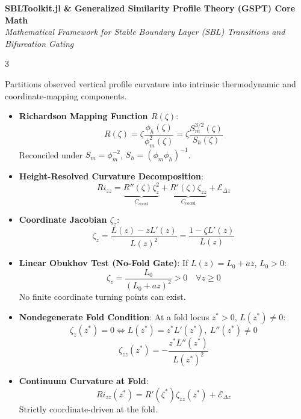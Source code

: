 \documentclass[9pt,landscape,letterpaper]{article}
\begin{document}

\begin{center}
    \textbf{\large SBLToolkit.jl \& Generalized Similarity Profile Theory (GSPT) Core Math} \\
    \vskip 0.5mm
    \footnotesize \textit{Mathematical Framework for Stable Boundary Layer (SBL) Transitions and Bifurcation Gating}
\end{center}
\vskip 1mm

\begin{multicols}{3}
\footnotesize

\begin{tcolorbox}[cheatsheetbox, title=1. GSPT Curvature Decomposition]
Partitions observed vertical profile curvature into intrinsic thermodynamic and coordinate-mapping components.
\begin{itemize}
    \item \textbf{Richardson Mapping Function $R(\zeta)$}:
    $$R(\zeta) = \zeta \frac{\phi_h(\zeta)}{\phi_m^2(\zeta)} = \zeta \frac{S_m^{3/2}(\zeta)}{S_h(\zeta)}$$
    Reconciled under $S_m = \phi_m^{-2}$, $S_h = (\phi_m \phi_h)^{-1}$.
    \item \textbf{Height-Resolved Curvature Decomposition}:
    $$Ri_{zz} = \underbrace{R''(\zeta)\zeta_z^2}_{C_{\text{const}}} + \underbrace{R'(\zeta)\zeta_{zz}}_{C_{\text{coord}}} + \mathcal{E}_{\Delta z}$$
    \item \textbf{Coordinate Jacobian $\zeta_z$}:
    $$\zeta_z = \frac{L(z) - z L'(z)}{L(z)^2} = \frac{1 - \zeta L'(z)}{L(z)}$$
    \item \textbf{Linear Obukhov Test (No-Fold Gate)}:
    If $L(z) = L_0 + az$, $L_0 > 0$:
    $$\zeta_z = \frac{L_0}{(L_0 + az)^2} > 0 \quad \forall z \ge 0$$
    No finite coordinate turning points can exist.
    \item \textbf{Nondegenerate Fold Condition}:
    At a fold locus $z^* > 0$, $L(z^*) \neq 0$:
    $$\zeta_z(z^*) = 0 \iff L(z^*) = z^* L'(z^*), \ L''(z^*) \neq 0$$
    $$\zeta_{zz}(z^*) = -\frac{z^* L''(z^*)}{L(z^*)^2}$$
    \item \textbf{Continuum Curvature at Fold}:
    $$Ri_{zz}(z^*) = R'(\zeta^*)\zeta_{zz}(z^*) + \mathcal{E}_{\Delta z}$$
    Strictly coordinate-driven at the fold.
\end{itemize}
\end{tcolorbox}


\end{multicols}
\end{document}
